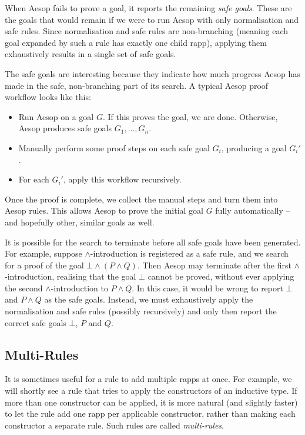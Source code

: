 When Aesop fails to prove a goal, it reports the remaining \emph{safe goals}.
These are the goals that would remain if we were to run Aesop with only normalisation and safe rules.
Since normalisation and safe rules are non-branching (meaning each goal expanded by such a rule has exactly one child rapp), applying them exhaustively results in a single set of safe goals.

The safe goals are interesting because they indicate how much progress Aesop has made in the safe, non-branching part of its search.
A typical Aesop proof workflow looks like this:
\begin{itemize}
  \item
    Run Aesop on a goal $G$.
    If this proves the goal, we are done.
    Otherwise, Aesop produces safe goals $G_{1}, \dots, G_{n}$.
  \item
    Manually perform some proof steps on each safe goal $G_{i}$, producing a goal $G_{i}'$.
  \item
    For each $G_{i}'$, apply this workflow recursively.
\end{itemize}
Once the proof is complete, we collect the manual steps and turn them into Aesop rules.
This allows Aesop to prove the initial goal $G$ fully automatically -- and hopefully other, similar goals as well.

It is possible for the search to terminate before all safe goals have been generated.
For example, suppose $∧$-introduction is registered as a safe rule, and we search for a proof of the goal $⊥ ∧ (P ∧ Q)$.
Then Aesop may terminate after the first $∧$-introduction, realising that the goal $⊥$ cannot be proved, without ever applying the second $∧$-introduction to $P ∧ Q$.
In this case, it would be wrong to report $⊥$ and $P ∧ Q$ as the safe goals.
Instead, we must exhaustively apply the normalisation and safe rules (possibly recursively) and only then report the correct safe goals $⊥$, $P$ and $Q$.

\subsection{Multi-Rules}

It is sometimes useful for a rule to add multiple rapps at once.
For example, we will shortly see a rule that tries to apply the constructors of an inductive type.
If more than one constructor can be applied, it is more natural (and slightly faster) to let the rule add one rapp per applicable constructor, rather than making each constructor a separate rule.
Such rules are called \emph{multi-rules}.

